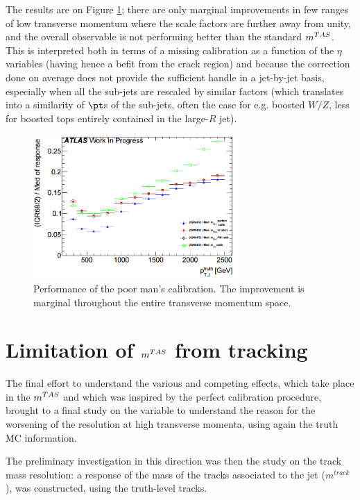 The results are on Figure \ref{fig:perfcalib4}; there are only marginal improvements in few ranges of low transverse momentum where the scale factors are further away from unity, and the overall observable is not performing better than the standard $m^{TAS}$. This is interpreted both in terms of a missing calibration as a function of the $\eta$ variables (having hence a befit from the crack region) and because the correction done on average does not provide the sufficient handle in a jet-by-jet basis, especially when all the sub-jets are rescaled by similar factors (which translates into a similarity of $\pt$s of the sub-jets, often the case for e.g. boosted $W/Z$, less for boosted tops entirely contained in the large-$R$ jet).

\begin{figure}[!ht]
  \centering
      \includegraphics[width=0.7\textwidth]{jet_part/calib/perfectcalib4.png}
  \caption[Simple calibration]{Performance of the poor man's calibration. The improvement is marginal throughout the entire transverse momentum space.}
  \label{fig:perfcalib4}
\end{figure}

\section{Limitation of $m^{TAS}$ from tracking}
The final effort to understand the various and competing effects, which take place in the $m^{TAS}$ and which was inspired by the perfect calibration procedure, brought to a final study on the variable to understand the reason for the worsening of the resolution at high transverse momenta, using again the truth MC information.

The preliminary investigation in this direction was then the study on the track mass resolution: a response of the mass of the tracks associated to the jet ($m^{track}$), was constructed, using the truth-level tracks.

